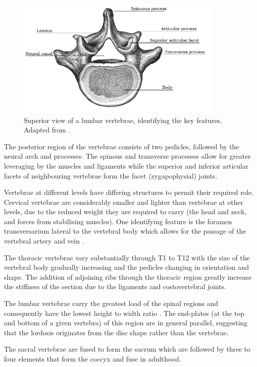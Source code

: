 \begin{figure}[hbt]
\centering

  \includegraphics[width=10cm]{images/vertebra.png}
  \caption{Superior view of a lumbar vertebrae, identifying the key features.
Adapted from \cite{Gray1918}.}
\label{fig:vertebra}
\end{figure}


The posterior region of the vertebrae consists of two pedicles, followed
by the neural arch and processes. The spinous and transverse processes
allow for greater leveraging by the muscles and ligaments while the
superior and inferior articular facets of neighbouring vertebrae form
the facet (zygapophysial) joints.

Vertebrae at different levels have differing structures to permit their
required role. Cervical vertebrae are considerably smaller and lighter
than vertebrae at other levels, due to the reduced weight they are
required to carry (the head and neck, and forces from stabilising
muscles). One identifying feature is the foramen transversarium lateral
to the vertebral body which allows for the passage of the vertebral
artery and vein \cite{panjabi1991cervical}.

The thoracic vertebrae vary substantially through T1 to T12 with the
size of the vertebral body gradually increasing and the pedicles
changing in orientation and shape. The addition of adjoining ribs
through the thoracic region greatly increase the stiffness of the
section due to the ligaments and costovertebral joints.

The lumbar vertebrae carry the greatest load of the spinal regions
\cite{Stewart2006} and consequently have the lowest height to width ratio
\cite{Manohar1992}.
The end-plates (at the top and bottom of a given vertebra) of this region are in general parallel, suggesting that
the lordosis originates from the disc shape rather than the vertebrae.

The sacral vertebrae are fused to form the sacrum which are followed by
three to four elements that form the coccyx and fuse in adulthood.
